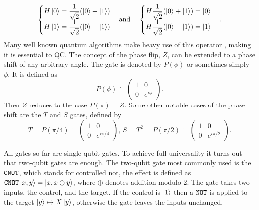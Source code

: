 \begin{equation}
\begin{cases}
H\ket{0} = \dfrac{1}{\sqrt{2}}(\ket{0} + \ket{1})
\\
H\ket{1} = \dfrac{1}{\sqrt{2}}(\ket{0} - \ket{1})
\end{cases}
\text{and}\hspace{4mm}
\begin{cases}
H\dfrac{1}{\sqrt{2}}(\ket{0} + \ket{1}) = \ket{0}
\\
H\dfrac{1}{\sqrt{2}}(\ket{0} - \ket{1}) = \ket{1}
\end{cases}.
\end{equation}
Many well known quantum algorithms make heavy use of this operator \cite{Grover,shor}, making it is essential to QC.
The concept of the phase flip, $Z$, can be extended to a phase shift of any arbitrary angle. The gate is denoted by $P(\phi)$ or sometimes simply $\phi$. It is defined as 
\begin{equation}
P(\phi) \dot{=} \begin{pmatrix}
1 & 0 \\
0 & e^{i\phi}
\end{pmatrix}.
\end{equation}
Then $Z$ reduces to the case $P(\pi) = Z$. Some other notable cases of the phase shift are the $T$ and $S$ gates, defined by
\begin{equation}
T = P({\pi/4}) \dot{=} \begin{pmatrix}
1 & 0 \\ 0 & e^{i\pi/4}
\end{pmatrix},\, S = T^2 = P({\pi/2}) \dot{=} \begin{pmatrix}
1 & 0 \\ 0 & e^{i\pi/2}
\end{pmatrix}.
\end{equation}

All gates so far are single-qubit gates. To achieve full universality it turns out that two-qubit gates are enough. The two-qubit gate most commonly used is the ${\tt CNOT}$, which stands for controlled not, the effect is defined as ${\tt CNOT}\ket{x,y} = \ket{x,x\oplus y}$, where $\oplus$ denotes addition modulo 2. The gate takes two inputs, the control, and the target. If the control is $\ket{1}$ then a ${\tt NOT}$ is applied to the target $\ket{y} \mapsto X\ket{y}$, otherwise the gate leaves the inputs unchanged.



